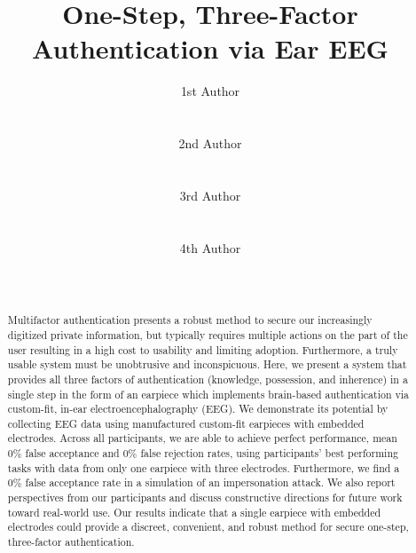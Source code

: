 \documentclass{sigchi}
\begin{document}
\title{One-Step, Three-Factor Authentication via Ear EEG}

\author{
  \alignauthor 1st Author\\
    \\
    \\
  \alignauthor 2nd Author\\
    \\
    \\
  \alignauthor 3rd Author\\
    \\
    \\
  \alignauthor 4th Author\\
    \\
    \\
}

\maketitle

\begin{abstract}
 Multifactor authentication presents a robust method to secure our increasingly digitized private information, but typically requires multiple actions on the part of the user resulting in a high cost to usability and limiting adoption. Furthermore, a truly usable system must be unobtrusive and inconspicuous. Here, we present a system that provides all three factors of authentication (knowledge, possession, and inherence) in a single step in the form of an earpiece which implements brain-based authentication via custom-fit, in-ear electroencephalography (EEG). We demonstrate its potential by collecting EEG data using manufactured custom-fit earpieces with embedded electrodes. Across all participants, we are able to achieve perfect performance, mean 0\% false acceptance and 0\% false rejection rates, using participants' best performing tasks with data from only one earpiece with three electrodes. Furthermore, we find a 0\% false acceptance rate in a simulation of an impersonation attack. We also report perspectives from our participants and discuss constructive directions for future work toward real-world use. Our results indicate that a single earpiece with embedded electrodes could provide a discreet, convenient, and robust method for secure one-step, three-factor authentication.
\end{abstract}
\end{document}
